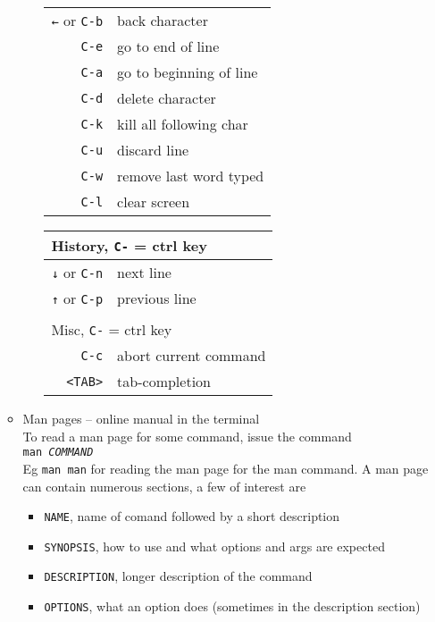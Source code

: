 \documentclass[a4,landscape]{seminar}
\begin{document}
\begin{slide}
\begin{itemize}
\begin{itemize}
\begin{itemize}
\begin{tabular}{|r|l|}
          \texttt{←} or \texttt{C-b} & back character\\
          \texttt{C-e} & go to end of line\\
          \texttt{C-a} & go to beginning of line\\
          \texttt{C-d} & delete character\\
          \texttt{C-k} & kill all following char\\
          \texttt{C-u} & discard line\\
          \texttt{C-w} & remove last word typed\\
          \texttt{C-l} & clear screen\\\hline
          \end{tabular}
          \begin{tabular}{|r|l|}
          \hline
          \multicolumn{2}{|l|}{History, \texttt{C-} = ctrl key }\\\hline\hline
          \texttt{↓} or \texttt{C-n} & next line\\
          \texttt{↑} or \texttt{C-p} & previous line\\\hline
          \multicolumn{2}{l}{}\\\hline
          \multicolumn{2}{|l|}{Misc, \texttt{C-} = ctrl key }\\\hline\hline
          \texttt{C-c} & abort current command\\
          \texttt{<TAB>} & tab-completion\\\hline
        \end{tabular}
      \end{itemize}
      \clearpage{}
    \item Man pages -- online manual in the terminal\\[1ex]
      To read a man page for some command, issue the command\\[1ex]
      \texttt{man \textsl{COMMAND}}\\[1ex]
      Eg \texttt{man man} for reading the man page for the man command. A man page can contain numerous sections, a few of interest are
      \begin{itemize}
      \item \texttt{NAME}, name of comand followed by a short description
      \item \texttt{SYNOPSIS}, how to use and what options and args are expected
      \item \texttt{DESCRIPTION}, longer description of the command
      \item \texttt{OPTIONS}, what an option does (sometimes in the description section)

\end{itemize}
\end{itemize}
\end{itemize}
\end{slide}
\end{document}
